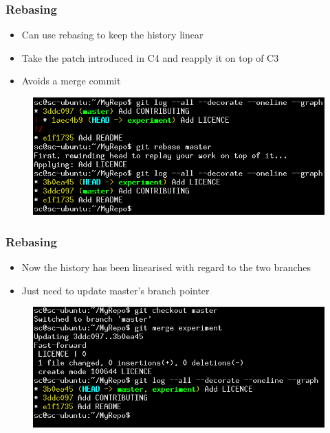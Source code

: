 \documentclass{beamer}
\begin{document}
\begin{frame}
	\frametitle{Rebasing}
	\begin{itemize}
		\item{Can use rebasing to keep the history linear}
		\item{Take the patch introduced in C4 and reapply it on top of C3}
		\item{Avoids a merge commit}
	\end{itemize}
	\begin{figure}
		\includegraphics[scale=0.4]{Rebasing-3.png}
	\end{figure}
\end{frame}

\begin{frame}
	\frametitle{Rebasing}
	\begin{itemize}
		\item{Now the history has been linearised with regard to the two branches}
		\item{Just need to update master's branch pointer}
	\end{itemize}
	\begin{figure}
		\includegraphics[scale=0.4]{Rebasing-4.png}
	\end{figure}
\end{frame}
\end{document}

